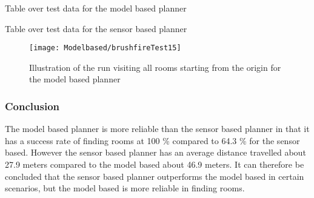 \documentclass[../Head/Main.tex]{subfiles}
\begin{document}
\begin{table}[H]
	
	\caption{Table over test data for the model based planner}
	\label{tab:modelbased}
\end{table}

\begin{table}[H]
	
	\caption{Table over test data for the sensor based planner}
	\label{tab:sensorbased}
\end{table}





\begin{figure}[H]
	\centering
	\texttt{[image: Modelbased/brushfireTest15]}
	\caption{Illustration of the run visiting all rooms starting from the origin for the model based planner}
	\label{fig:Test15}
\end{figure}

\subsubsection*{Conclusion}

The model based planner is more reliable than the sensor based planner in that it has a success rate of finding rooms at 100 \% compared to 64.3 \% for the sensor based. However the sensor based planner has an average distance travelled about 27.9 meters compared to the model based about 46.9 meters. It can therefore be concluded that the sensor based planner outperforms the model based in certain scenarios, but the model based is more reliable in finding rooms. 
\end{document}
